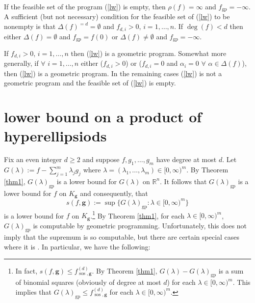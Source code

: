 \documentclass{amsart}
\theoremstyle{definition}
\begin{document}
If the feasible set of the program (\ref{lw}) is empty, then $\rho(f) = \infty$ and $f_{\operatorname{gp}} = -\infty$.
A sufficient (but not necessary) condition for the feasible set of (\ref{lw}) to be nonempty is that $\Delta(f)^{=d} =\emptyset$
and $f_{d,i}>0$, $i=1,\dots,n$. If $\deg(f)<d$ then either $\Delta(f)=\emptyset$ and $f_{\operatorname{gp}}=f(0)$ or
$\Delta(f)\ne \emptyset$ and $f_{\operatorname{gp}}=-\infty$.

If $f_{d,i}>0$, $i=1,\dots,n$ then (\ref{lw}) is a geometric program. Somewhat more generally, if $\forall$ $i=1,\dots,n$
either ($f_{d,i}>0$) or ($f_{d,i}=0$ and  $\alpha_i=0$ $\forall$ $\alpha \in \Delta(f)$), then (\ref{lw}) is a geometric program.
In the remaining cases (\ref{lw}) is not a geometric program and the feasible set of (\ref{lw}) is empty.
%
\section{lower bound on a product of hyperellipsiods}
%

Fix an even integer $d \ge 2$ and suppose $f, g_1,\dots,g_m$ have degree at most $d$. Let $G(\lambda) := f-\sum_{j=1}^m \lambda_jg_j$ where
$\lambda = (\lambda_1,\dots,\lambda_m) \in [0,\infty)^m$. By Theorem \ref{thm1}, $G(\lambda)_{\operatorname{gp}}$ is a lower bound for $G(\lambda)$ on $\mathbb{R}^n$. It follows that $G(\lambda)_{\operatorname{gp}}$ is a lower bound for $f$ on $K_{\mathbf{g}}$ and consequently, that
\[
	s(f,\mathbf{g}):=\sup\{ G(\lambda)_{\operatorname{gp}} : \lambda \in [0,\infty)^m\}
\]
is a lower bound for $f$ on $K_{\mathbf{g}}$.\footnote{In fact, $s(f,\mathbf{g}) \le f_{\operatorname{sos},\mathbf{g}}^{(d)}$.
By Theorem \ref{thm1}, $G(\lambda)-G(\lambda)_{\operatorname{gp}}$ is a sum of binomial squares (obviously of degree at most $d$)
for each $\lambda \in [0,\infty)^m$. This implies that $G(\lambda)_{\operatorname{gp}} \le f_{\operatorname{sos},\mathbf{g}}^{(d)}$
for each $\lambda \in [0,\infty)^m$.}  By Theorem \ref{thm1}, for  each
$\lambda \in [0,\infty)^m$, $G(\lambda)_{\operatorname{gp}}$ is computable by geometric programming.
Unfortunately, this does not imply that the supremum is so computable, but there are certain special cases where it is \cite{gha-mar3}. In particular, we have the following: %
\end{document}
